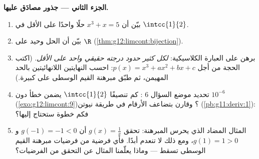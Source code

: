 \begin{problem}
\medskip
\noindent\textbf{الجزء الثاني --- جذور مصادَق عليها.}
\begin{enumerate}[resume]
  \item بيّن أن  $x^3 + x = 5$ حلًا واحدًا على الأقل
        في $\intcc{1}{2}$.
  \item بيّن أن الحل وحيد على $\R$
        (\cref{thm:g12:limcont:bijection}).
  \item برهن على العبارة الكلاسيكية: \emph{لكل كثير حدود درجته 
         حقيقي واحد على الأقل}. (اكتب الحجة
        من أجل $p(x) = x^3 + a x^2 + b x + c$: احسب النهايتين
        اللانهائيتين بالحد المهيمن، ثم طبّق مبرهنة القيم الوسطى على
         كبيرة.)
  \item تحديد موضع  السؤال 6 : كم
        تنصيفًا  $\intcc{1}{2}$ يضمن خطأ دون
        $10^{-6}$ (\cref{exo:g12:limcont:9})؟ وقارن بتضاعف
        الأرقام في طريقة نيوتن
        (\cref{pb:g11:deriv:1}): فكم خطوة  ستحتاج إليها؟
  \item المثال المضاد الذي يحرس المبرهنة:
        تحقق $g(x) = \frac1x$ أن $g(-1) = -1 < 0$ و
        $g(1) = 1 > 0$، ومع ذلك لا تنعدم أبدًا. فأي فرضية من فرضيات
        مبرهنة القيم الوسطى تسقط --- وماذا يعلّمنا المثال عن
        التحقق من الفرضيات؟
\end{enumerate}


\end{problem}
